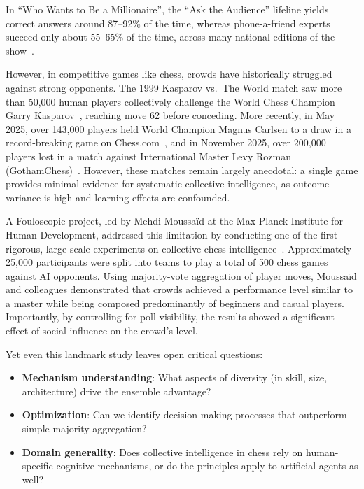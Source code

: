 \documentclass{article}
\begin{document}
In ``Who Wants to Be a Millionaire'', the ``Ask the Audience'' lifeline yields correct answers around 87--92\% of the time, whereas phone-a-friend experts succeed only about 55--65\% of the time, across many national editions of the show~\cite{surowiecki2004}.

However, in competitive games like chess, crowds have historically struggled against strong opponents.
The 1999 Kasparov vs.\ The World match saw more than 50,000 human players collectively challenge the World Chess Champion Garry Kasparov~\cite{kasparov1999}, reaching move 62 before conceding.
More recently, in May 2025, over 143,000 players held World Champion Magnus Carlsen to a draw in a record-breaking game on Chess.com~\cite{chess2025}, and in November 2025, over 200,000 players lost in a match against International Master Levy Rozman (GothamChess)~\cite{gothamchess2025}.
However, these matches remain largely anecdotal: a single game provides minimal evidence for systematic collective intelligence, as outcome variance is high and learning effects are confounded.

A Fouloscopie project, led by Mehdi Moussaïd at the Max Planck Institute for Human Development, addressed this limitation by conducting one of the first rigorous, large-scale experiments on collective chess intelligence~\cite{moussaid2025}.
Approximately 25,000 participants were split into teams to play a total of 500 chess games against AI opponents.
Using majority-vote aggregation of player moves, Moussaïd and colleagues demonstrated that crowds achieved a performance level similar to a master while being composed predominantly of beginners and casual players.
Importantly, by controlling for poll visibility, the results showed a significant effect of social influence on the crowd's level.

Yet even this landmark study leaves open critical questions:
\begin{itemize}
  \item \textbf{Mechanism understanding}: What aspects of diversity (in skill, size, architecture) drive the ensemble advantage?
  \item \textbf{Optimization}: Can we identify decision-making processes that outperform simple majority aggregation?
  \item \textbf{Domain generality}: Does collective intelligence in chess rely on human-specific cognitive mechanisms, or do the principles apply to artificial agents as well?
\end{itemize}
\end{document}
